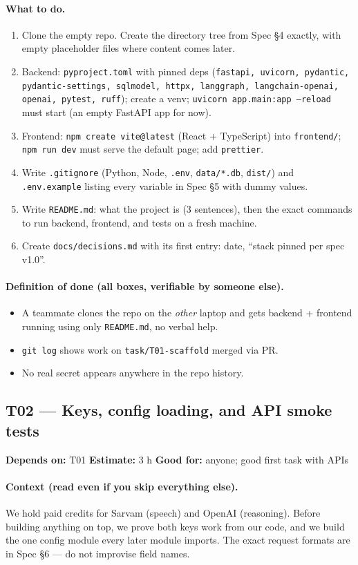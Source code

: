 \documentclass[11pt]{article}
\newcommand{\code}[1]{\texttt{#1}}
\newcommand{\taskmeta}[3]{\noindent\textbf{Depends on:} #1 \quad\textbullet\quad \textbf{Estimate:} #2 \quad\textbullet\quad \textbf{Good for:} #3\par\vspace{2pt}}
\newcommand{\ctx}[1]{\paragraph{Context (read even if you skip everything else).} #1}
\newcommand{\dod}{\paragraph{Definition of done (all boxes, verifiable by someone else).}}
\begin{document}
\paragraph{What to do.}
\begin{enumerate}
  \item Clone the empty repo. Create the directory tree from Spec \S4 exactly, with empty placeholder files where content comes later.
  \item Backend: \code{pyproject.toml} with pinned deps (\code{fastapi, uvicorn, pydantic, pydantic-settings, sqlmodel, httpx, langgraph, langchain-openai, openai, pytest, ruff}); create a venv; \code{uvicorn app.main:app --reload} must start (an empty FastAPI app for now).
  \item Frontend: \code{npm create vite@latest} (React + TypeScript) into \code{frontend/}; \code{npm run dev} must serve the default page; add \code{prettier}.
  \item Write \code{.gitignore} (Python, Node, \code{.env}, \code{data/*.db}, \code{dist/}) and \code{.env.example} listing every variable in Spec \S5 with dummy values.
  \item Write \code{README.md}: what the project is (3 sentences), then the exact commands to run backend, frontend, and tests on a fresh machine.
  \item Create \code{docs/decisions.md} with its first entry: date, ``stack pinned per spec v1.0''.
\end{enumerate}
\dod
\begin{itemize}
  \item A teammate clones the repo on the \emph{other} laptop and gets backend + frontend running using only \code{README.md}, no verbal help.
  \item \code{git log} shows work on \code{task/T01-scaffold} merged via PR.
  \item No real secret appears anywhere in the repo history.
\end{itemize}

\subsection{T02 --- Keys, config loading, and API smoke tests}
\taskmeta{T01}{3 h}{anyone; good first task with APIs}
\ctx{We hold paid credits for Sarvam (speech) and OpenAI (reasoning). Before building anything on top, we prove both keys work from our code, and we build the one config module every later module imports. The exact request formats are in Spec \S6 --- do not improvise field names.}
\end{document}
